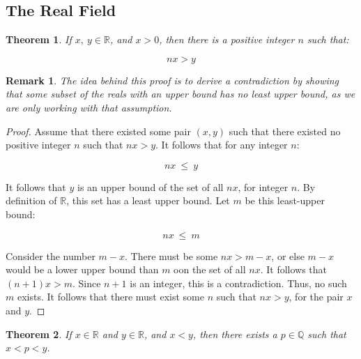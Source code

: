 \documentclass[10pt, oneside]{article}
\newtheorem{thm}{Theorem}
\newtheorem{rem}{Remark}
\begin{document}
\subsection{The Real Field}

\begin{thm}
	If $x, \ y \in \mathbb{R}$, and $x > 0$, then there is a positive integer 
	$n$ such that:

	$$nx > y$$
\end{thm}

\begin{rem}
	The idea behind this proof is to derive a contradiction by showing that some subset 
	of the reals with an upper bound has no least upper bound, as we are only working with 
	that assumption.
\end{rem}

\begin{proof}
	Assume that there existed some pair $(x, y)$ such that there existed no positive 
	integer $n$ such that $nx > y$. It follows that for any integer $n$:

	$$nx \ \leq \ y$$

	It follows that $y$ is an upper bound of the set of all $nx$, for integer $n$. By definition of $\mathbb{R}$,
  this set has a least upper bound. Let $m$ be this least-upper bound:

  $$nx \ \leq \ m$$

  Consider the number $m - x$. There must be some $nx > m - x$, or else $m - x$ would be a lower upper
  bound than $m$ oon the set of all $nx$. It follows that $(n + 1)x > m$. Since $n + 1$ is an integer, this
  is a contradiction. Thus, no such $m$ exists. It follows that there must exist some $n$ such that $nx > y$, for the
  pair $x$ and $y$.
\end{proof}

\begin{thm}
  If $x \in \mathbb{R}$ and $y \in \mathbb{R}$, and $x < y$, then there exists a $p \in \mathbb{Q}$ such that $x < p < y$.
\end{thm}
\end{document}

